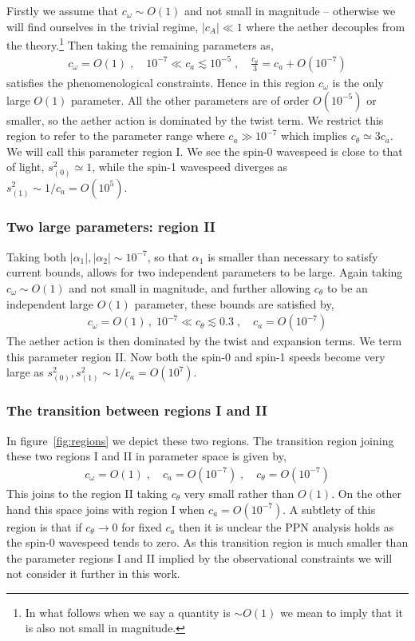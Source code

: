 \documentclass[12pt]{article}
\numberwithin{equation}{section}
\begin{document}
Firstly we assume that $c_\omega \sim O(1)$ and not small in magnitude -- otherwise we will find ourselves in the trivial regime, $|c_A | \ll 1$ where the aether decouples from the theory.\footnote{In what follows when we say a quantity is $\sim O(1)$ we mean to imply that it is also not small in magnitude.}
Then taking the remaining parameters as,
\begin{eqnarray}
c_\omega = O(1) \; , \quad 10^{-7} \ll c_{a} \lesssim 10^{-5}  \; , \quad \frac{c_\theta}{3} =  c_a  + O(10^{-7}) 
\end{eqnarray}
satisfies the phenomenological constraints.
Hence in this region $c_\omega$ is the only large $O(1)$ parameter. All the other parameters are of order $O(10^{-5})$ or smaller, 
so the aether action is
dominated  by the twist term.
We restrict this region to refer to the parameter range where $c_a \gg 10^{-7}$ which implies $c_\theta \simeq 3 c_a$.
We will call this parameter region I.
We see the spin-0 wavespeed is close to that of light, $s_{(0)}^2 \simeq 1$, while the spin-1 wavespeed diverges as $s_{(1)}^2 \sim 1/c_a = O(10^5)$. 

\subsubsection*{Two large parameters: region II}

Taking both $|\alpha_1|, |\alpha_2| \sim 10^{-7}$, so that $\alpha_1$ is smaller than necessary to satisfy current bounds, allows for two independent parameters to be large.  
Again taking $c_\omega\sim O(1)$ and not small in magnitude, and further allowing $c_\theta$ to be an independent large $O(1)$ parameter, these bounds are satisfied by,
\begin{eqnarray}
c_\omega  = O(1)\, , \; 10^{-7} \ll c_\theta \lesssim 0.3 \; , \quad c_{a} = O(10^{-7}) 
\end{eqnarray}
The aether action is then dominated by the twist and expansion terms.
We term this parameter region II.
Now both the spin-0 and spin-1 speeds become very large as $s_{(0)}^2, s_{(1)}^2 \sim  1/c_{a} = O(10^7)$. 

\subsubsection*{The transition between regions I and II}

In figure~\ref{fig:regions} we depict these two regions.
The transition region joining these two regions I and II in  parameter space is given by,
\begin{eqnarray}
c_\omega = O(1) \; , \quad c_{a} = O(10^{-7}) \; , \quad c_\theta = O(10^{-7}) 
\end{eqnarray}
This joins to the region II taking $c_\theta$ very small rather than $O(1)$. On the other hand this space joins with region I when $c_{a} = O(10^{-7})$. 
A subtlety of this region is that if $c_\theta \to 0$ for fixed $c_a$ then it is unclear the PPN analysis holds as the spin-0 wavespeed tends to zero.
As this transition region is much smaller than the parameter regions I and II implied by the observational constraints we will not consider it further in this work. 
\end{document}
